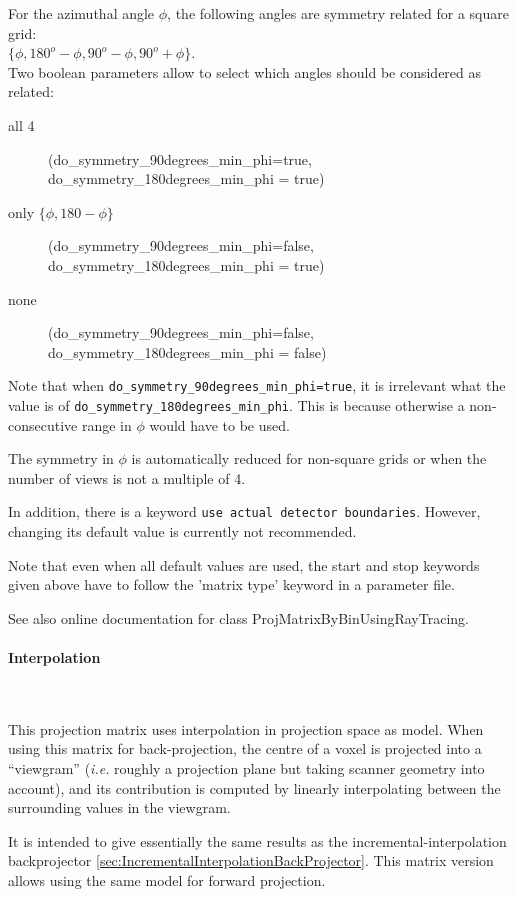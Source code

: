 \documentclass{article}
\newcommand{\subsubsubsection}[1]{\paragraph{#1}\mbox{} \\}
\begin{document}
{For the azimuthal angle $\phi$, the following angles are symmetry 
related for a square grid: \\
$\{\phi, 180^{o}-\phi, 90^{o}-\phi, 90^{o}+\phi\}$.\\
Two boolean parameters allow to select which angles should be 
considered as related:
\begin{description}
\item[all 4]
  (do\_symmetry\_90degrees\_min\_phi=true,  \\
do\_symmetry\_180degrees\_min\_phi = true)
\item[only $\{ \phi, 180- \phi \}$]
(do\_symmetry\_90degrees\_min\_phi=false,  \\
do\_symmetry\_180degrees\_min\_phi = true)
\item[none]
(do\_symmetry\_90degrees\_min\_phi=false, \\
do\_symmetry\_180degrees\_min\_phi = false)
\end{description}

Note that when \texttt{do\_symmetry\_90degrees\_min\_phi=true}, 
it is irrelevant what the value is 
of \texttt{do\_symmetry\_180degrees\_min\_phi}. This is because 
otherwise a non-consecutive range in $\phi$ would have to be used.


The symmetry in $\phi$ is automatically reduced for non-square grids 
or when the number of views is not a multiple of 4.



In addition, there is a keyword \texttt{use actual detector boundaries}. 
However, changing its default value is currently not recommended. 




Note that even when all default values are used, the start and 
stop keywords given above have to follow the 'matrix type' keyword 
in a parameter file.


See also online documentation for class ProjMatrixByBinUsingRayTracing. 


{ \subsubsubsection{Interpolation}
}
\label{sec:projmatrixusinginterpolation}
This projection matrix uses interpolation in projection space as model. 
When using this matrix for back-projection, the centre of a voxel is projected 
into a ``viewgram'' (\textit{i.e.} roughly a projection plane but taking scanner 
geometry into account), and its contribution is computed by linearly interpolating
between the surrounding values in the viewgram.

It is intended to give
essentially the same results as the incremental-interpolation backprojector
\ref{sec:IncrementalInterpolationBackProjector}.
This matrix version allows using the same model for forward projection. 

}
\end{document}
